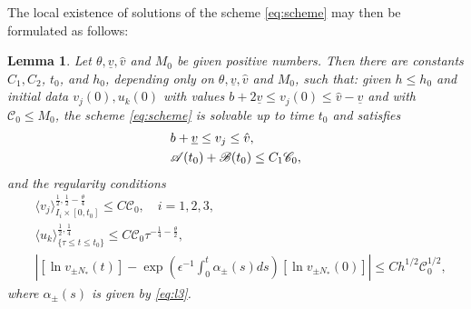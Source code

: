 \documentclass[a4paper,oneside,11pt]{article}
\numberwithin{equation}{section}
\newtheorem{lemma}{Lemma}[section]
\begin{document}
The local existence of solutions of the scheme \eqref{eq:scheme} may then be formulated as follows: 
\begin{lemma}\label{thm-exsit2}
Let \(\theta, \underline{v}, \hat{v}\) and \(M_{0}\) be given positive numbers. Then there are constants \(C_1, C_2\), \(t_{0}\), and \(h_0\), depending only on $\theta, \underline{v},\hat v$ and $M_{0}$, such that: given \(h\leq h_{0}\) and initial data \(v_{j}(0), u_{k}(0)\) with values \(b+2\underline{v}\leq v_{j}( 0)\leq \hat v-\underline{v}\)
and with \(\mathscr{C} _{0}\leq M_{0}\), the scheme \eqref{eq:scheme} is solvable up to time \(t_0\) and satisfies
\begin{align}
\displaystyle  &b+\underline{v}\leq v_{j}\leq \hat v, \label{local-01} \\
&\mathscr{A}(t_0)+\mathscr{B}(t_0)\leq C_1\mathscr{C}_0, \label{local-02} %
\end{align}
and the regularity conditions
\begin{align}
&\langle v_{j}\rangle_{I_i\times[0,t_{0}]}^{\frac{1}{2},\frac{1}{2}-\frac{\theta}{4}}\leq C\mathscr{C}_{0},\quad i=1,2,3, \label{local-04}\\
&\langle u_k\rangle_{\{\tau\leq t\leq t_0\}}^{\frac{1}{2},\frac{1}{4}}\leq C\mathscr{C}_0\tau^{-\frac{1}{4}-\frac{\theta}{2}},\label{local-06}\\
&\left|\left[\ln v_{\pm N_* }(t)\right]-\exp\left(\epsilon^{-1}\int_{0}^{t}\alpha_{\pm}(s)ds\right)\left[\ln v_{\pm N_* }(0)\right]\right|\leq Ch^{1/2}\mathscr{C}_0^{1/2},\label{local-07}
\end{align}
where \(\alpha_{\pm}(s)\) is given by \eqref{eq:l3}.
\end{lemma}
\end{document}
